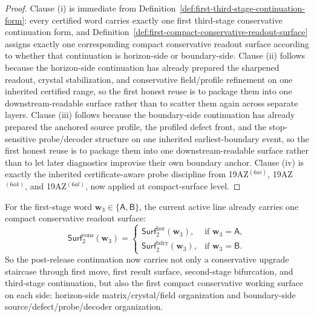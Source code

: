 \begin{proof}
Clause (i) is immediate from Definition~\ref{def:first-third-stage-continuation-form}: every certified word carries exactly one first third-stage conservative continuation form, and Definition~\ref{def:first-compact-conservative-readout-surface} assigns exactly one corresponding compact conservative readout surface according to whether that continuation is horizon-side or boundary-side. Clause (ii) follows because the horizon-side continuation has already prepared the sharpened readout, crystal stabilization, and conservative field/profile refinement on one inherited certified range, so the first honest reuse is to package them into one downstream-readable surface rather than to scatter them again across separate layers. Clause (iii) follows because the boundary-side continuation has already prepared the anchored source profile, the profiled defect front, and the stop-sensitive probe/decoder structure on one inherited earliest-boundary event, so the first honest reuse is to package them into one downstream-readable surface rather than to let later diagnostics improvise their own boundary anchor. Clause (iv) is exactly the inherited certificate-aware probe discipline from 19AZ$^{(6ai)}$, 19AZ$^{(6ak)}$, and 19AZ$^{(6al)}$, now applied at compact-surface level.
\end{proof}

\begin{corollary}
\label{cor:present-post-v3290-line-already-carries-a-first-compact-conservative-readout-surface}
For the first-stage word \(\mathbf w_3\in\{\mathsf A,\mathsf B\}\), the current active line already carries one compact conservative readout surface:
\[
  \mathsf{Surf}^{\mathrm{cons}}_{2}(\mathbf w_3)
  =
  \begin{cases}
    \mathsf{Surf}^{\mathrm{hor}}_{2}(\mathbf w_3), & \text{if }\mathbf w_3=\mathsf A,\\[2mm]
    \mathsf{Surf}^{\mathrm{bdry}}_{2}(\mathbf w_3), & \text{if }\mathbf w_3=\mathsf B.
  \end{cases}
\]
So the post-release continuation now carries not only a conservative upgrade staircase through first move, first result surface, second-stage bifurcation, and third-stage continuation, but also the first compact conservative working surface on each side: horizon-side matrix/crystal/field organization and boundary-side source/defect/probe/decoder organization.
\end{corollary}

